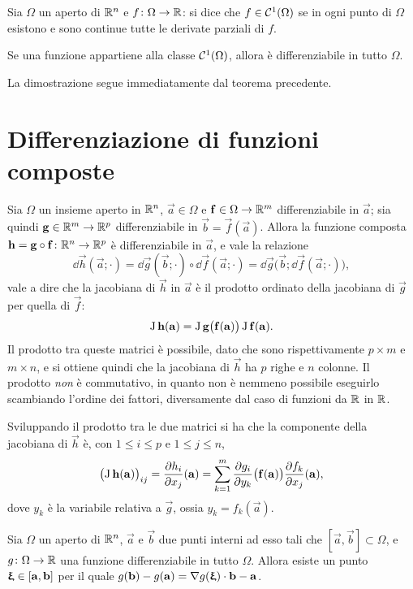 \begin{definizione}
Sia $\Omega$ un aperto di $\mathbb{R}^n$ e $f\colon\Omega\to\mathbb{R}$: si dice che $f\in\mathcal{C}^{{1}}(\Omega)$ se in ogni punto di $\Omega$ esistono e sono continue tutte le derivate parziali di $f$.
\end{definizione}
\begin{corollario}
Se una funzione appartiene alla classe $\mathcal{C}^{{1}}(\Omega)$, allora è differenziabile in tutto $\Omega$.
\end{corollario}
La dimostrazione segue immediatamente dal teorema precedente.

\section{Differenziazione di funzioni composte}
\begin{teorema}
Sia $\Omega$ un insieme aperto in $\mathbb{R}^n$, $\vec a\in\Omega$ e $\mathbf{f}\in\Omega\to\mathbb{R}^m$ differenziabile in $\vec a$; sia quindi $\mathbf{g}\in\mathbb{R}^m\to\mathbb{R}^p$ differenziabile in $\vec b=\vec f(\vec a)$.
Allora la funzione composta $\mathbf{h}=\mathbf{g}\circ\mathbf{f}\colon\mathbb{R}^n\to\mathbb{R}^p$ è differenziabile in $\vec a$, e vale la relazione
\begin{equation} \label{eq:composizione_differenziali}
\dd\vec h(\vec a;\cdot)=\dd\vec g(\vec b;\cdot)\circ\dd\vec f(\vec a;\cdot)=\dd\vec g\big(\vec b;\dd\vec f(\vec a;\cdot)\big),
\end{equation}
vale a dire che la jacobiana di $\vec h$ in $\vec a$ è il prodotto ordinato della jacobiana di $\vec g$ per quella di $\vec f$:
\[
\operatorname{J}\mathbf{h}(\mathbf{a})=\operatorname{J}\mathbf{g}\big(\mathbf{f}(\mathbf{a})\big)\operatorname{J}\mathbf{f}(\mathbf{a}).
\]
Il prodotto tra queste matrici è possibile, dato che sono rispettivamente $p\times m$ e $m\times n$, e si ottiene quindi che la jacobiana di $\vec h$ ha $p$ righe e $n$ colonne. Il prodotto \emph{non} è commutativo, in quanto non è nemmeno possibile eseguirlo scambiando l'ordine dei fattori, diversamente dal caso di funzioni da $\mathbb{R}$ in $\mathbb{R}$.
\end{teorema}
Sviluppando il prodotto tra le due matrici si ha che la componente della jacobiana di $\vec h$ è, con $1\leq i\leq p$ e $1\leq j\leq n$,
\[
\big(\!\operatorname{J}\mathbf{h}(\mathbf{a})\big)_{ij}=\frac{\partial {h_i}}{\partial {x_j}}(\mathbf{a})=\sum_{k=1}^m\frac{\partial {g_i}}{\partial {y_k}}\big(\mathbf{f}(\mathbf{a})\big)\frac{\partial {f_k}}{\partial {x_j}}(\mathbf{a}),
\]
dove $y_k$ è la variabile relativa a $\vec g$, ossia $y_k=f_k(\vec a)$.
\begin{teorema}[di Lagrange] \label{t:lagrange_piu_variabili}
Sia $\Omega$ un aperto di $\mathbb{R}^n$, $\vec a$ e $\vec b$ due punti interni ad esso tali che $[\vec a,\vec b]\subset\Omega$, e $g\colon\Omega\to\mathbb{R}$ una funzione differenziabile in tutto $\Omega$. Allora esiste un punto $\bm{\upxi}\in[\mathbf{a},\mathbf{b}]$ per il quale $g(\mathbf{b})-g(\mathbf{a})={\nabla g(\bm{\upxi})}\cdot{\mathbf{b}-\mathbf{a}}$.
\end{teorema}
